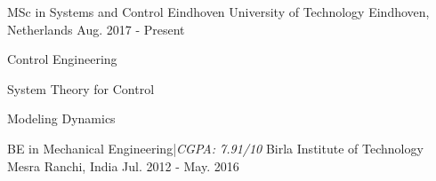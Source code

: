 \begin{cventries}
  \cventry
  	{MSc in Systems and Control}
  	{Eindhoven University of Technology}
  	{Eindhoven, Netherlands}
  	{Aug. 2017 - Present}
  	{\begin{cvitems}
		\scriptsize	
		\item {Control Engineering}
		\item {System Theory for Control}
		\item {Modeling Dynamics}
	\end{cvitems}  	
  	}
  \cventry
    {BE in Mechanical Engineering\quad |\quad \textit{CGPA: 7.91/10}}
    {Birla Institute of Technology Mesra}
    {Ranchi, India}
    {Jul. 2012 - May. 2016}
    {}
\end{cventries}
\vspace{-1.5em}
     \vspace{0.75em}
\vspace{1.5em}